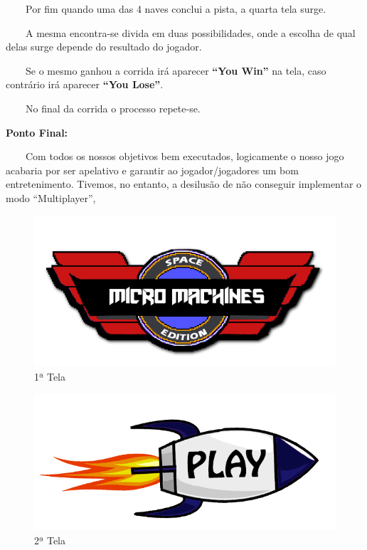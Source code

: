 \documentclass[a4paper]{report} %
\begin{document}
           \par \ \ \ \ Por fim quando uma das 4 naves conclui a pista, a quarta tela surge. 	
           \par \ \ \ \ A mesma encontra-se divida em duas possibilidades, onde a escolha de qual delas surge depende do resultado do jogador.
           \par \ \ \ \ Se o mesmo ganhou a corrida irá aparecer \textbf{“You Win”} na tela, caso contrário irá aparecer \textbf{“You Lose”}.
           \par \ \ \ \ No final da corrida o processo repete-se. 
           \vspace{16mm}
           \par \textbf{Ponto Final:}
           \par \ \ \ \ Com todos os nossos objetivos bem executados, logicamente o nosso jogo acabaria por ser apelativo e garantir ao jogador/jogadores um bom entretenimento. Tivemos, no entanto, a desilusão de não conseguir implementar o modo “Multiplayer”,
           
               \begin{figure}[h!]
               \centering
               \includegraphics [scale = 0.3] {sc1.png}
               \caption{1ª Tela}
               \end{figure}
           
           \begin{figure}[h!]
               \centering
               \includegraphics [scale = 0.3] {sc2.png}
               \caption{2ª Tela}
               \end{figure}
           
\end{document}
